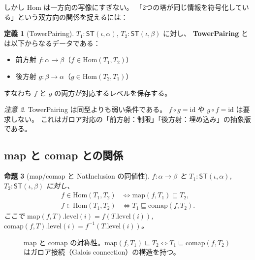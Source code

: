\documentclass[a4paper,11pt]{ltjsarticle}
\theoremstyle{definition}
\newtheorem{definition}{定義}[section]
\theoremstyle{plain}
\newtheorem{proposition}[definition]{命題}
\theoremstyle{remark}
\newtheorem{remark}[definition]{注意}
\newcommand{\ST}{\mathsf{ST}}
\newcommand{\NatInc}{\sqsubseteq}
\newcommand{\Hom}{\mathrm{Hom}}
\newcommand{\map}{\mathrm{map}}
\newcommand{\comap}{\mathrm{comap}}
\begin{document}
しかし Hom は一方向の写像にすぎない。
「2つの塔が同じ情報を符号化している」という双方向の関係を捉えるには：

\begin{definition}[TowerPairing]
$T_1 : \ST(\iota, \alpha)$, $T_2 : \ST(\iota, \beta)$ に対し、
\textbf{TowerPairing} とは以下からなるデータである：
\begin{itemize}
  \item 前方射 $f : \alpha \to \beta$（$f \in \Hom(T_1, T_2)$）
  \item 後方射 $g : \beta \to \alpha$（$g \in \Hom(T_2, T_1)$）
\end{itemize}
すなわち $f$ と $g$ の両方が対応するレベルを保存する。
\end{definition}

\begin{remark}
TowerPairing は同型よりも弱い条件である。
$f \circ g = \mathrm{id}$ や $g \circ f = \mathrm{id}$ は要求しない。
これはガロア対応の「前方射：制限」「後方射：埋め込み」の抽象版である。
\end{remark}

\subsection{map と comap との関係}

\begin{proposition}[map/comap と NatInclusion の同値性]
$f : \alpha \to \beta$ と $T_1 : \ST(\iota, \alpha)$,
$T_2 : \ST(\iota, \beta)$ に対し、
\begin{align}
  f \in \Hom(T_1, T_2) &\iff \map(f, T_1) \NatInc T_2, \\
  f \in \Hom(T_1, T_2) &\iff T_1 \NatInc \comap(f, T_2).
\end{align}
ここで $\map(f, T).\mathrm{level}(i) = f(T.\mathrm{level}(i))$,
$\comap(f, T).\mathrm{level}(i) = f^{-1}(T.\mathrm{level}(i))$。
\end{proposition}

\begin{figure}[h]
\centering
{}
\caption{$\map$ と $\comap$ の対称性。$\map(f, T_1) \NatInc T_2 \iff T_1 \NatInc \comap(f, T_2)$
はガロア接続（Galois connection）の構造を持つ。}
\end{figure}
\end{document}
